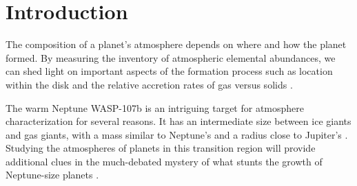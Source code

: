 \documentclass[twocolumn]{aastex61}
\begin{document}





\section{Introduction} \label{sec:intro}
The composition of a planet's atmosphere depends on where and how the planet formed. By measuring the inventory of atmospheric elemental abundances, we can shed light on important aspects of the formation process such as location within the disk and the relative accretion rates of gas versus solids \citep[][]{oberg11, fortney13, madhusudhan14, alidib16, mordasini16, espinoza17}.  

The warm Neptune WASP-107b is an intriguing target for atmosphere characterization for several reasons.  It has an intermediate size between ice giants and gas giants, with a mass similar to Neptune's and a radius close to Jupiter's \citep[$0.12\,M_\mathrm{Jup}$, $0.94\,R_\mathrm{Jup}$;][]{anderson17}. Studying the atmospheres of planets in this transition region will provide additional clues in the much-debated mystery of what stunts the growth of Neptune-size planets \citep[e.g][]{pollack96, dawson16, frelikh17}.  
\end{document}
